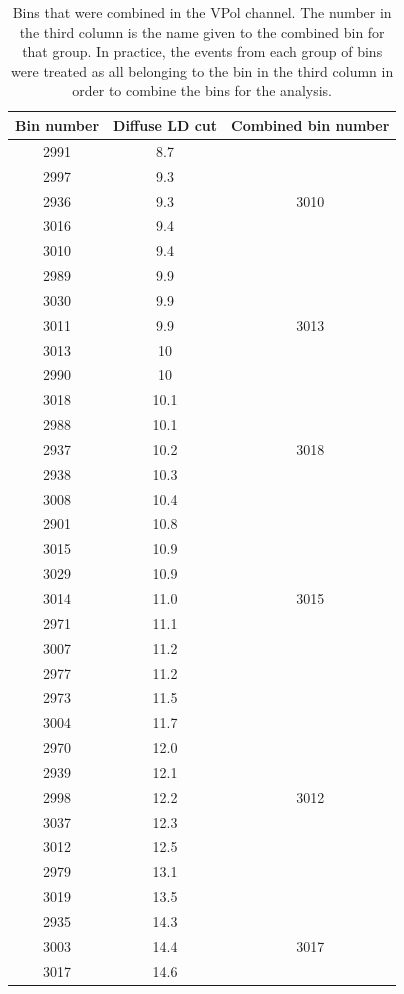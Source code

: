 \begin{table}
\centering
\begin{tabular}{ |c|c|c| } 
\hline
Bin number & Diffuse LD cut & Combined bin number\\
\hline
2991 &	8.7 & \\
2997 &	9.3 & \\
2936 &	9.3 & 3010\\
3016 &	9.4 & \\
3010 &	9.4 & \\
\hline
2989 &	9.9 & \\
3030 &	9.9 & \\
3011 &	9.9 & 3013\\
3013 &	10 & \\
2990 &	10 & \\
\hline
3018 &	10.1 & \\
2988 &	10.1 & \\
2937 &	10.2 & 3018\\
2938 &	10.3 & \\
3008 &	10.4 & \\
\hline
2901 &	10.8 & \\
3015 &	10.9 & \\
3029 &	10.9 & \\
3014 &	11.0 & 3015\\
2971 &	11.1 & \\
3007 &	11.2 & \\
2977 &	11.2 & \\
\hline
2973 &	11.5 & \\
3004 &	11.7 & \\
2970 &	12.0 & \\
2939 &	12.1 & \\
2998 &	12.2 & 3012\\
3037 &	12.3 & \\
3012 &	12.5 & \\
2979 &	13.1 & \\
3019 &	13.5 & \\
\hline
2935 &	14.3 & \\
3003 &	14.4 & 3017\\
3017 &	14.6 & \\
\hline
\end{tabular}
\caption{Bins that were combined in the VPol channel. The number in the third column is the name given to the combined bin for that group. In practice, the events from each group of bins were treated as all belonging to the bin in the third column in order to combine the bins for the analysis.}
\label{combine}
\end{table}

